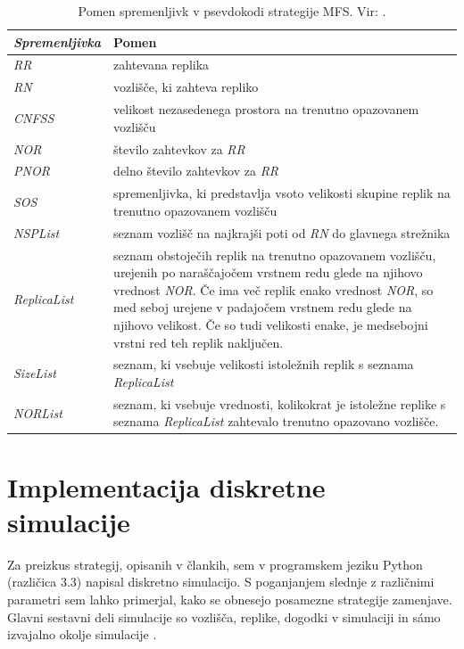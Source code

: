 \documentclass[a4paper, 12pt]{book}
\begin{document}
\begin{table}
\small
  \begin{center}
    \begin{tabulary}{1.0\textwidth}{ >{\itshape}p{6.8em} p{26em}}
      \textnormal{Spremenljivka} & Pomen \\
      \hline
      RR & zahtevana replika \\
      RN &  vozlišče, ki zahteva repliko \\
      CNFSS & velikost nezasedenega prostora na trenutno opazovanem
          \mbox{vozlišču} \\
      NOR & število zahtevkov za \textit{RR} \\
      PNOR & delno število zahtevkov za \textit{RR} \\
      SOS & spremenljivka, ki predstavlja vsoto velikosti skupine replik na
          trenutno opazovanem vozlišču \\
      NSPList & seznam vozlišč na najkrajši poti od \textit{RN} do
          glavnega strežnika \\
      ReplicaList & seznam obstoječih replik na trenutno opazovanem vozlišču,
          urejenih po naraščajočem vrstnem redu glede na njihovo vrednost
          \textit{NOR}.
          Če ima več replik enako vrednost \textit{NOR}, so med seboj
          urejene v padajočem vrstnem redu glede na njihovo velikost. Če so
          tudi velikosti enake, je medsebojni vrstni red teh replik
          naključen. \\
      SizeList & seznam, ki vsebuje velikosti istoležnih replik s seznama
          \textit{ReplicaList} \\
      NORList & seznam, ki vsebuje vrednosti, kolikokrat je istoležne
          replike s seznama \textit{ReplicaList} zahtevalo trenutno opazovano
          vozlišče. \\
    \end{tabulary}
  \end{center}

  \caption{Pomen spremenljivk v psevdokodi strategije MFS. Vir: \cite{mfs2012}.}
  \label{tbl:MFS_vars}
\end{table}


\section{Implementacija diskretne simulacije}

Za preizkus strategij, opisanih v člankih, sem v programskem jeziku Python
(različica 3.3) napisal diskretno simulacijo. S poganjanjem slednje z
raz\-ličnimi parametri sem lahko primerjal, kako se obnesejo posamezne
strategije zamenjave. Glavni sestavni deli simulacije so vozlišča, replike,
dogodki v simulaciji in sámo izvajalno okolje simulacije \cite{plamut_github}.
\end{document}
